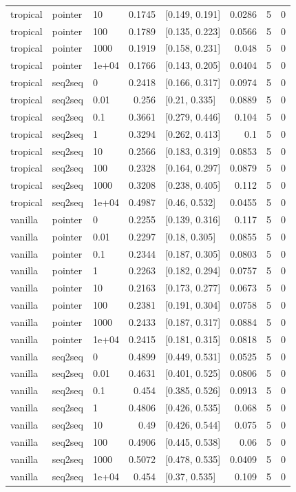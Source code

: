 \documentclass[10pt]{article}
\begin{document}
{\begin{longtable}{lllrlrrr}
tropical & pointer & 10 & 0.1745 & [0.149, 0.191] & 0.0286 & 5 & 0\\
tropical & pointer & 100 & 0.1789 & [0.135, 0.223] & 0.0566 & 5 & 0\\
tropical & pointer & 1000 & 0.1919 & [0.158, 0.231] & 0.048 & 5 & 0\\
tropical & pointer & 1e+04 & 0.1766 & [0.143, 0.205] & 0.0404 & 5 & 0\\
tropical & seq2seq & 0 & 0.2418 & [0.166, 0.317] & 0.0974 & 5 & 0\\
tropical & seq2seq & 0.01 & 0.256 & [0.21, 0.335] & 0.0889 & 5 & 0\\
tropical & seq2seq & 0.1 & 0.3661 & [0.279, 0.446] & 0.104 & 5 & 0\\
tropical & seq2seq & 1 & 0.3294 & [0.262, 0.413] & 0.1 & 5 & 0\\
tropical & seq2seq & 10 & 0.2566 & [0.183, 0.319] & 0.0853 & 5 & 0\\
tropical & seq2seq & 100 & 0.2328 & [0.164, 0.297] & 0.0879 & 5 & 0\\
tropical & seq2seq & 1000 & 0.3208 & [0.238, 0.405] & 0.112 & 5 & 0\\
tropical & seq2seq & 1e+04 & 0.4987 & [0.46, 0.532] & 0.0455 & 5 & 0\\
vanilla & pointer & 0 & 0.2255 & [0.139, 0.316] & 0.117 & 5 & 0\\
vanilla & pointer & 0.01 & 0.2297 & [0.18, 0.305] & 0.0855 & 5 & 0\\
vanilla & pointer & 0.1 & 0.2344 & [0.187, 0.305] & 0.0803 & 5 & 0\\
vanilla & pointer & 1 & 0.2263 & [0.182, 0.294] & 0.0757 & 5 & 0\\
vanilla & pointer & 10 & 0.2163 & [0.173, 0.277] & 0.0673 & 5 & 0\\
vanilla & pointer & 100 & 0.2381 & [0.191, 0.304] & 0.0758 & 5 & 0\\
vanilla & pointer & 1000 & 0.2433 & [0.187, 0.317] & 0.0884 & 5 & 0\\
vanilla & pointer & 1e+04 & 0.2415 & [0.181, 0.315] & 0.0818 & 5 & 0\\
vanilla & seq2seq & 0 & 0.4899 & [0.449, 0.531] & 0.0525 & 5 & 0\\
vanilla & seq2seq & 0.01 & 0.4631 & [0.401, 0.525] & 0.0806 & 5 & 0\\
vanilla & seq2seq & 0.1 & 0.454 & [0.385, 0.526] & 0.0913 & 5 & 0\\
vanilla & seq2seq & 1 & 0.4806 & [0.426, 0.535] & 0.068 & 5 & 0\\
vanilla & seq2seq & 10 & 0.49 & [0.426, 0.544] & 0.075 & 5 & 0\\
vanilla & seq2seq & 100 & 0.4906 & [0.445, 0.538] & 0.06 & 5 & 0\\
vanilla & seq2seq & 1000 & 0.5072 & [0.478, 0.535] & 0.0409 & 5 & 0\\
vanilla & seq2seq & 1e+04 & 0.454 & [0.37, 0.535] & 0.109 & 5 & 0\\
\bottomrule
\end{longtable}
}
\end{document}
